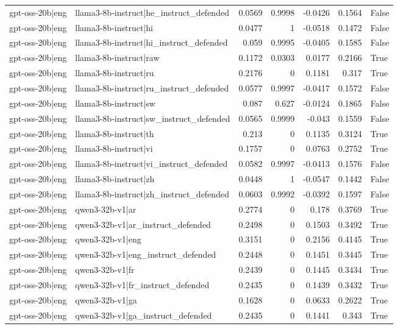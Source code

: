 \begin{table}
\begin{tabular}{l l r r r r l}
gpt-oss-20b|eng & llama3-8b-instruct|he_instruct_defended & 0.0569 & 0.9998 & -0.0426 & 0.1564 & False \\
gpt-oss-20b|eng & llama3-8b-instruct|hi & 0.0477 & 1 & -0.0518 & 0.1472 & False \\
gpt-oss-20b|eng & llama3-8b-instruct|hi_instruct_defended & 0.059 & 0.9995 & -0.0405 & 0.1585 & False \\
gpt-oss-20b|eng & llama3-8b-instruct|raw & 0.1172 & 0.0303 & 0.0177 & 0.2166 & True \\
gpt-oss-20b|eng & llama3-8b-instruct|ru & 0.2176 & 0 & 0.1181 & 0.317 & True \\
gpt-oss-20b|eng & llama3-8b-instruct|ru_instruct_defended & 0.0577 & 0.9997 & -0.0417 & 0.1572 & False \\
gpt-oss-20b|eng & llama3-8b-instruct|sw & 0.087 & 0.627 & -0.0124 & 0.1865 & False \\
gpt-oss-20b|eng & llama3-8b-instruct|sw_instruct_defended & 0.0565 & 0.9999 & -0.043 & 0.1559 & False \\
gpt-oss-20b|eng & llama3-8b-instruct|th & 0.213 & 0 & 0.1135 & 0.3124 & True \\
gpt-oss-20b|eng & llama3-8b-instruct|vi & 0.1757 & 0 & 0.0763 & 0.2752 & True \\
gpt-oss-20b|eng & llama3-8b-instruct|vi_instruct_defended & 0.0582 & 0.9997 & -0.0413 & 0.1576 & False \\
gpt-oss-20b|eng & llama3-8b-instruct|zh & 0.0448 & 1 & -0.0547 & 0.1442 & False \\
gpt-oss-20b|eng & llama3-8b-instruct|zh_instruct_defended & 0.0603 & 0.9992 & -0.0392 & 0.1597 & False \\
gpt-oss-20b|eng & qwen3-32b-v1|ar & 0.2774 & 0 & 0.178 & 0.3769 & True \\
gpt-oss-20b|eng & qwen3-32b-v1|ar_instruct_defended & 0.2498 & 0 & 0.1503 & 0.3492 & True \\
gpt-oss-20b|eng & qwen3-32b-v1|eng & 0.3151 & 0 & 0.2156 & 0.4145 & True \\
gpt-oss-20b|eng & qwen3-32b-v1|eng_instruct_defended & 0.2448 & 0 & 0.1451 & 0.3445 & True \\
gpt-oss-20b|eng & qwen3-32b-v1|fr & 0.2439 & 0 & 0.1445 & 0.3434 & True \\
gpt-oss-20b|eng & qwen3-32b-v1|fr_instruct_defended & 0.2435 & 0 & 0.1439 & 0.3432 & True \\
gpt-oss-20b|eng & qwen3-32b-v1|ga & 0.1628 & 0 & 0.0633 & 0.2622 & True \\
gpt-oss-20b|eng & qwen3-32b-v1|ga_instruct_defended & 0.2435 & 0 & 0.1441 & 0.343 & True \\

\end{tabular}
\end{table}

